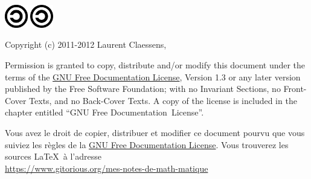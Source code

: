 \begin{center}

           \ifpdf
            \includegraphics[width=1cm]{Copyleft.png}
        \else
            \includegraphics[width=1cm]{Copyleft.eps}
        \fi

Copyright (c) 2011-2012  Laurent Claessens,

Permission is granted to copy, distribute and/or modify this document under the terms of the \href{http://www.gnu.org/licenses/fdl-1.3.html}{GNU Free Documentation License}, Version 1.3 or any later version published by the Free Software Foundation; with no Invariant Sections, no Front-Cover Texts, and no Back-Cover Texts. A copy of the license is included in the chapter entitled ``GNU Free Documentation~License''.

\vspace{0.5cm}

Vous avez le droit de copier, distribuer et modifier ce document pourvu que vous suiviez les règles de la \href{http://www.gnu.org/licenses/fdl-1.3.html}{GNU Free Documentation License}. Vous trouverez les sources \LaTeX\ à l'adresse\\ \url{https://www.gitorious.org/mes-notes-de-math-matique}






\end{center}

\clearpage


